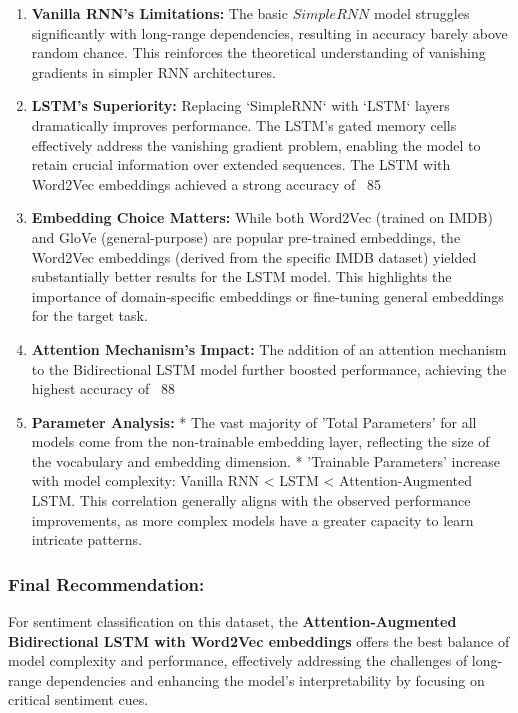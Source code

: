 \documentclass{article}
\begin{document}
\begin{enumerate}
\item \textbf{Vanilla RNN's Limitations:} The basic $SimpleRNN$ model struggles significantly with long-range dependencies, resulting in accuracy barely above random chance. This reinforces the theoretical understanding of vanishing gradients in simpler RNN architectures.

\item \textbf{LSTM's Superiority:} Replacing `SimpleRNN` with `LSTM` layers dramatically improves performance. The LSTM's gated memory cells effectively address the vanishing gradient problem, enabling the model to retain crucial information over extended sequences. The LSTM with Word2Vec embeddings achieved a strong accuracy of ~85%

\item \textbf{Embedding Choice Matters:} While both Word2Vec (trained on IMDB) and GloVe (general-purpose) are popular pre-trained embeddings, the Word2Vec embeddings (derived from the specific IMDB dataset) yielded substantially better results for the LSTM model. This highlights the importance of domain-specific embeddings or fine-tuning general embeddings for the target task.

\item \textbf{Attention Mechanism's Impact:} The addition of an attention mechanism to the Bidirectional LSTM model further boosted performance, achieving the highest accuracy of ~88%

\item \textbf{Parameter Analysis:}
    *   The vast majority of 'Total Parameters' for all models come from the non-trainable embedding layer, reflecting the size of the vocabulary and embedding dimension.
    *   'Trainable Parameters' increase with model complexity: Vanilla RNN < LSTM < Attention-Augmented LSTM. This correlation generally aligns with the observed performance improvements, as more complex models have a greater capacity to learn intricate patterns.
\end{enumerate}

\subsubsection*{Final Recommendation:} 
For sentiment classification on this dataset, the \textbf{Attention-Augmented Bidirectional LSTM with Word2Vec embeddings} offers the best balance of model complexity and performance, effectively addressing the challenges of long-range dependencies and enhancing the model's interpretability by focusing on critical sentiment cues.
\end{document}
